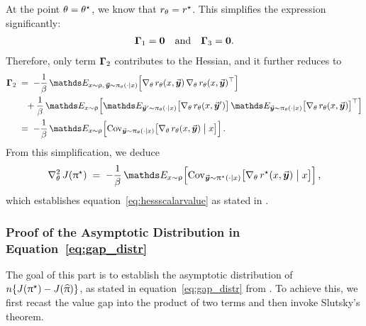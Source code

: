 	At the point $\theta = \theta^{\star}$, we know that $r_{\theta} = r^{\star}$. This simplifies the expression significantly:
	\begin{align*}
	\boldsymbol{\Gamma}_1 = \boldsymbol{0} \quad \text{and} \quad \boldsymbol{\Gamma}_3 = \boldsymbol{0}.
	\end{align*}
	Therefore, only term $\boldsymbol{\Gamma}_2$ contributes to the Hessian, and it further reduces to
	\begin{align*}
		\GammaMt_2
		& \; = \; - \frac{1}{\parabeta} \, \Exp_{\prompt \sim \promptdistr, \,  \response \sim \policytheta(\cdot \mid \prompt)}
		\Big[ \gradtheta \rewardtheta(\prompt, \response) \, \gradtheta \rewardtheta(\prompt, \response)^{\top} \Big]  \\
		& \quad + \frac{1}{\parabeta} \, \Exp_{\prompt \sim \promptdistr}
		\Big[ \Exp_{\responsenew \sim \policytheta(\cdot \mid \prompt)}\big[ \gradtheta \rewardtheta(\prompt, \responsenew) \big] \, \Exp_{\response \sim \policytheta(\cdot \mid \prompt)}\big[\gradtheta \rewardtheta(\prompt, \response)\big]^{\top} \Big] \\
		& \; = \; - \frac{1}{\parabeta} \, \Exp_{\prompt \sim \promptdistr}
		\Big[ \Cov_{\response \sim \policytheta(\cdot \mid \prompt)} \big[ \gradtheta \rewardtheta(\prompt, \response) \bigm| \prompt \big] \Big]  \, .
	\end{align*}
	From this simplification, we deduce
	\begin{align*}
		\hesstheta \scalarvalue(\policystar) \; = \;
		- \frac{1}{\parabeta} \, \Exp_{\prompt \sim \promptdistr} \Big[ \Cov_{\response \sim \policystar(\cdot \mid \prompt)} \big[ \gradtheta \rewardstar(\prompt, \response) \bigm| \prompt \big] \Big] \, ,
	\end{align*}
	which establishes equation~\eqref{eq:hessscalarvalue} as stated in .


	
	\subsubsection{Proof of the Asymptotic Distribution in Equation~\eqref{eq:gap_distr}}
	\label{sec:proof:gap_distr}
	
	The goal of this part is to establish the asymptotic distribution of $n \{ J(\uppi^{\star}) - J(\widehat{\uppi}) \}$, as stated in equation~\eqref{eq:gap_distr} from . To achieve this, we first recast the value gap into the product of two terms and then invoke Slutsky’s theorem.
	
